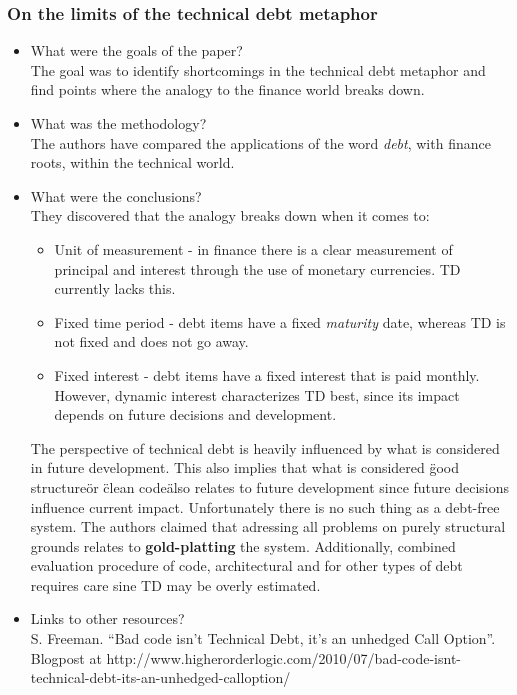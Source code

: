 \documentclass{mprop}
\begin{document}
\subsubsection{On the limits of the technical debt metaphor} \cite{Schmid2013}
\begin{itemize}
\item What were the goals of the paper? \\
The goal was to identify shortcomings in the technical debt metaphor and find points where the analogy to the finance world breaks down.
\item What was the methodology? \\
The authors have compared the applications of the word \textit{debt}, with finance roots, within the technical world.
\item What were the conclusions? \\
They discovered that the analogy breaks down when it comes to:
\begin{itemize}
	\item Unit of measurement - in finance there is a clear measurement of principal and interest through the use of monetary currencies. TD currently lacks this.
	\item Fixed time period - debt items have a fixed \textit{maturity} date, whereas TD is not fixed and does not go away.
	\item Fixed interest - debt items have a fixed interest that is paid monthly. However, dynamic interest characterizes TD best, since its impact depends on future decisions and development.
\end{itemize}
The perspective of technical debt is heavily influenced by what is considered in future development. 
This also implies that what is considered \"good structure\" or \"clean code\" also relates to future development since future decisions influence current impact.
Unfortunately there is no such thing as a debt-free system. The authors claimed that adressing all problems on purely structural grounds relates to \textbf{gold-platting} the system.
Additionally, combined evaluation procedure of code, architectural and for other types of debt requires care sine TD may be overly estimated.
\item Links to other resources? \\
S. Freeman. “Bad code isn’t Technical Debt, it’s an unhedged Call Option”. Blogpost at http://www.higherorderlogic.com/2010/07/bad-code-isnt-technical-debt-its-an-unhedged-calloption/
\end{itemize}
\end{document}
